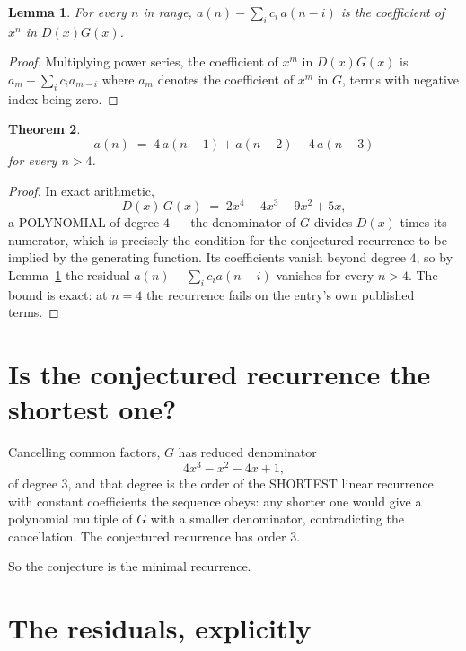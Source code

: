 \documentclass[11pt,a4paper]{article}
\theoremstyle{plain}
\newtheorem{theorem}{Theorem}
\newtheorem{lemma}[theorem]{Lemma}
\theoremstyle{definition}
\begin{document}
\begin{lemma}\label{lem:key}
For every $n$ in range, $a(n)-\sum_i c_i\,a(n-i)$ is the coefficient of $x^{n}$ in
$D(x)G(x)$.
\end{lemma}

\begin{proof}
Multiplying power series, the coefficient of $x^{m}$ in $D(x)G(x)$ is
$a_m-\sum_i c_i a_{m-i}$ where $a_m$ denotes the coefficient of $x^{m}$ in $G$, terms with
negative index being zero.
\end{proof}

\begin{theorem}
\[
a(n)\;=\;4\,a(n-1) + a(n-2) - 4\,a(n-3)
\]
for every $n>4$.
\end{theorem}

\begin{proof}
In exact arithmetic,
\[
D(x)\,G(x)\;=\;2 x^{4} - 4 x^{3} - 9 x^{2} + 5 x,
\]
a POLYNOMIAL of degree $4$ --- the denominator of $G$ divides $D(x)$ times its numerator,
which is precisely the condition for the conjectured recurrence to be implied by the
generating function. Its coefficients vanish beyond degree $4$, so by
Lemma~\ref{lem:key} the residual $a(n)-\sum_ic_ia(n-i)$ vanishes for every
$n>4$. The bound is exact: at $n=4$ the recurrence fails on the entry's own published terms.
\end{proof}

\section{Is the conjectured recurrence the shortest one?}

Cancelling common factors, $G$ has reduced denominator
\[
4 x^{3} - x^{2} - 4 x + 1,
\]
of degree $3$, and that degree is the order of the SHORTEST linear recurrence with
constant coefficients the sequence obeys: any shorter one would give a polynomial multiple of
$G$ with a smaller denominator, contradicting the cancellation. The conjectured recurrence has
order $3$.

So the conjecture is the minimal recurrence.

\section{The residuals, explicitly}
\end{document}
